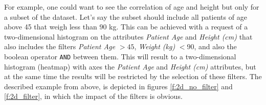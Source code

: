 For example, one could want to see the correlation of age and height but only for a subset of the dataset.
Let's say the subset should include all patients of age above 45 that weigh less than $90$ kg.
This can be achieved with a request of a two\hyp dimensional histogram on the attributes \textit{Patient Age} and \textit{Height (cm)} that also includes the filters \textit{Patient Age} $ > 45$, \textit{Weight (kg)} $ < 90$, and also the boolean operator \texttt{AND} between them.
This will result to a two\hyp dimensional histogram (heatmap) with axes the \textit{Patient Age} and \textit{Height (cm)} attributes, but at the same time the results will be restricted by the selection of these filters.
The described example from above, is depicted in figures \ref{f:2d_no_filter} and \ref{f:2d_filter}, in which the impact of the filters is obvious.


